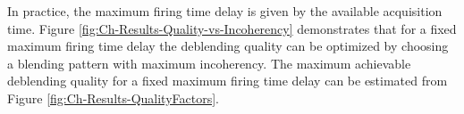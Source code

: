 In practice, the maximum firing time delay is given by the available acquisition time. Figure \ref{fig:Ch-Results-Quality-vs-Incoherency} demonstrates that for a fixed maximum firing time delay the deblending quality can be optimized by choosing a blending pattern with maximum incoherency. The maximum achievable deblending quality for a fixed maximum firing time delay can be estimated from Figure \ref{fig:Ch-Results-QualityFactors}.































